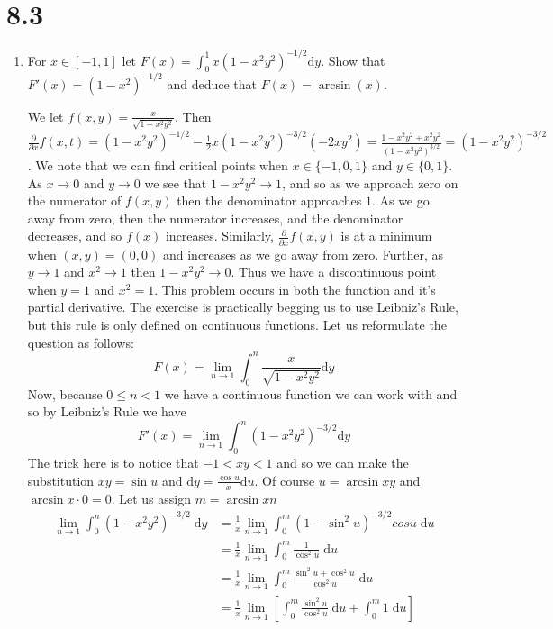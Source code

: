 \documentclass[letterpaper]{article}
\begin{document}
\renewcommand{\labelenumi}{\Alph{enumi}.}
\renewcommand{\labelenumii}{(\alph{enumii})}
\section*{8.3}
\begin{enumerate}
\item
For $x\in [-1,1]$ let $F(x)=\int_0^1{x(1-x^2y^2)^{-1/2}\mathrm{d}y}$. Show that $F'(x)=(1-x^2)^{-1/2}$ and deduce that $F(x)=\arcsin(x)$.

We let $\displaystyle f(x,y)=\frac{x}{\sqrt{1-x^2y^2}}$.
Then $\displaystyle \frac{\partial}{\partial x}f(x,t)=(1-x^2y^2)^{-1/2}-\frac{1}{2}x(1-x^2y^2)^{-3/2}(-2xy^2)=\frac{1-x^2y^2+x^2y^2}{(1-x^2y^2)^{3/2}}=(1-x^2y^2)^{-3/2}$.
We note that we can find critical points when $x\in \{-1,0,1\}$ and $y\in\{0,1\}$.
As $x\to 0$ and $y\to 0$ we see that $1-x^2y^2\to 1$, and so as we approach zero on the numerator of $f(x,y)$ then the denominator approaches $1$.
As we go away from zero, then the numerator increases, and the denominator decreases, and so $f(x)$ increases.
Similarly, $\frac{\partial}{\partial x}f(x,y)$ is at a minimum when $(x,y)=(0,0)$ and increases as we go away from zero.
Further, as $y\to 1$ and $x^2\to 1$ then $1-x^2y^2\to 0$.
Thus we have a discontinuous point when $y=1$ and $x^2=1$.
This problem occurs in both the function and it's partial derivative.
The exercise is practically begging us to use Leibniz's Rule, but this rule is only defined on continuous functions.
Let us reformulate the question as follows: 
\[F(x)=\lim_{n\to 1}\int_0^n{\frac{x}{\sqrt{1-x^2y^2}}\mathrm{d}y}\]
Now, because $0\le n< 1$ we have a continuous function we can work with and so by Leibniz's Rule we have
\[F'(x)=\lim_{n\to 1}\int_0^n{(1-x^2y^2)^{-3/2}\mathrm{d}y}\]
The trick here is to notice that $-1<xy<1$ and so we can make the substitution $xy=\sin u$ and $\mathrm{d}y=\frac{\cos u}{x}\mathrm{d}u$. Of course $u=\arcsin xy$ and $\arcsin x\cdot0=0$. Let us assign $m=\arcsin xn$
\begin{align*}
  \lim_{n\to 1}\int_0^n{(1-x^2y^2)^{-3/2}\;\mathrm{d}y}
  &=\frac{1}{x}\lim_{n\to 1}\int_0^m{(1-\sin^2u)^{-3/2}cos u\;\mathrm{d}u}\\
  &=\frac{1}{x}\lim_{n\to 1}\int_0^m{\frac{1}{\cos^2 u}\;\mathrm{d}u}\\
  &=\frac{1}{x}\lim_{n\to 1}\int_0^m{\frac{\sin^2u+\cos^2u}{\cos^2 u}\;\mathrm{d}u}\\
  &=\frac{1}{x}\lim_{n\to 1}\left[\int_0^m{\frac{\sin^2u}{\cos^2 u}\;\mathrm{d}u}+\int_0^m{1\;\mathrm{d}u}\right]\\

\end{align*}
\end{enumerate}
\end{document}
